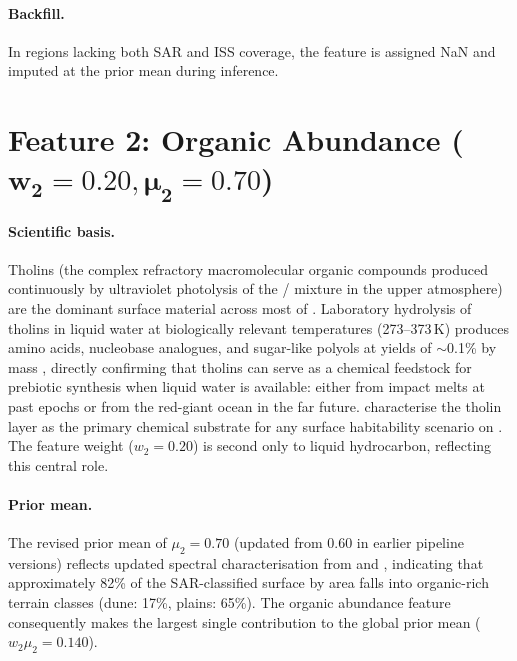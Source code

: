 \paragraph{Backfill.}
In regions lacking both SAR and ISS coverage, the feature is assigned NaN and
imputed at the prior mean during inference.

\section[Feature 2: Organic Abundance 
  ($w_2 = 0.20$, $\mu_2 = 0.70$)]{Feature 2: Organic Abundance 
  ($\boldsymbol{w_2 = 0.20, \mu_2 = 0.70}$)}
\label{sec:feat_organic}

\paragraph{Scientific basis.}
Tholins (the complex refractory macromolecular organic compounds produced
continuously by ultraviolet photolysis of the / mixture in the
upper atmosphere) are the dominant surface material across most of \titan{}.
Laboratory hydrolysis of
tholins in liquid water at biologically relevant temperatures (273--373\,K)
produces amino acids, nucleobase analogues, and sugar-like polyols at yields
of $\sim$0.1\% by mass \citep{Neish2010}, directly confirming that tholins
can serve as a chemical feedstock for prebiotic synthesis when liquid water
is available: either from impact melts at past epochs or from the red-giant
ocean in the far future.  \citet{MeyerDombard2025} characterise the tholin
layer as the primary chemical substrate for any surface habitability scenario
on \titan{}.  The feature weight ($w_2 = 0.20$) is second only to liquid
hydrocarbon, reflecting this central role.

\paragraph{Prior mean.}
The revised prior mean of $\mu_2 = 0.70$ (updated from 0.60 in earlier
pipeline versions) reflects updated spectral characterisation from
\citet{Malaska2025} and \citet{Cable2012}, indicating that approximately 82\%
of the SAR-classified surface by area falls into organic-rich terrain classes
(dune: 17\%, plains: 65\%).  The organic abundance feature consequently makes
the largest single contribution to the global prior mean
($w_2\mu_2 = 0.140$).


